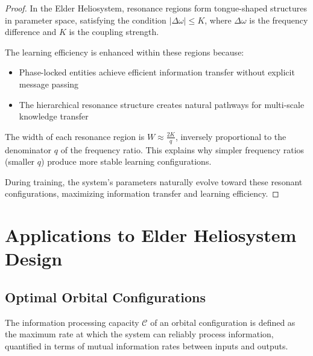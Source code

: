 \begin{proof}
In the Elder Heliosystem, resonance regions form tongue-shaped structures in parameter space, satisfying the condition $|\Delta\omega| \leq K$, where $\Delta\omega$ is the frequency difference and $K$ is the coupling strength.

The learning efficiency is enhanced within these regions because:
\begin{itemize}
    \item Phase-locked entities achieve efficient information transfer without explicit message passing
    \item The hierarchical resonance structure creates natural pathways for multi-scale knowledge transfer
\end{itemize}

The width of each resonance region is $W \approx \frac{2K}{q}$, inversely proportional to the denominator $q$ of the frequency ratio. This explains why simpler frequency ratios (smaller $q$) produce more stable learning configurations.

During training, the system's parameters naturally evolve toward these resonant configurations, maximizing information transfer and learning efficiency.
\end{proof}

\section{Applications to Elder Heliosystem Design}

\subsection{Optimal Orbital Configurations}

\begin{definition}
The information processing capacity $\mathcal{C}$ of an orbital configuration is defined as the maximum rate at which the system can reliably process information, quantified in terms of mutual information rates between inputs and outputs.
\end{definition}

